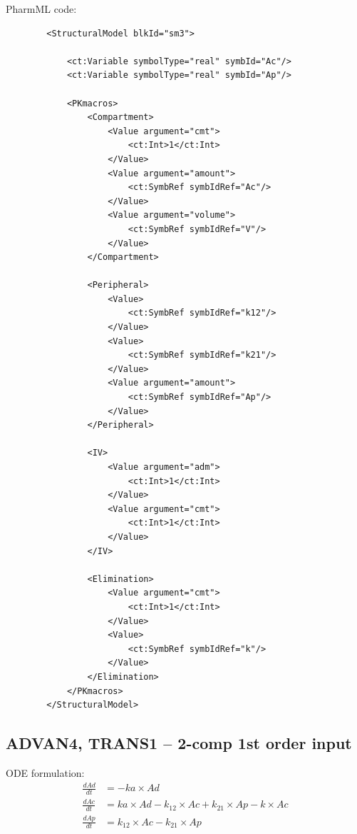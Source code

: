 PharmML code:
\lstset{language=XML}
\begin{lstlisting}
        <StructuralModel blkId="sm3">
            
            <ct:Variable symbolType="real" symbId="Ac"/>
            <ct:Variable symbolType="real" symbId="Ap"/>
            
            <PKmacros>
                <Compartment>
                    <Value argument="cmt">
                        <ct:Int>1</ct:Int>
                    </Value>
                    <Value argument="amount">
                        <ct:SymbRef symbIdRef="Ac"/>
                    </Value>
                    <Value argument="volume">
                        <ct:SymbRef symbIdRef="V"/>
                    </Value>
                </Compartment>
                
                <Peripheral>
                    <Value>
                        <ct:SymbRef symbIdRef="k12"/>
                    </Value>
                    <Value>
                        <ct:SymbRef symbIdRef="k21"/>
                    </Value>
                    <Value argument="amount">
                        <ct:SymbRef symbIdRef="Ap"/>
                    </Value>
                </Peripheral>
                
                <IV>
                    <Value argument="adm">
                        <ct:Int>1</ct:Int>
                    </Value>
                    <Value argument="cmt">
                        <ct:Int>1</ct:Int>
                    </Value>
                </IV>
                
                <Elimination>
                    <Value argument="cmt">
                        <ct:Int>1</ct:Int>
                    </Value>
                    <Value>
                        <ct:SymbRef symbIdRef="k"/>
                    </Value>
                </Elimination>
            </PKmacros>
        </StructuralModel>
\end{lstlisting}


\subsection{ADVAN4, TRANS1 -- 2-comp 1st order input}
ODE formulation:
\begin{align}
\frac{dAd}{dt} &= -ka \times Ad \nonumber \\
\frac{dAc}{dt} &= ka \times Ad - k_{12} \times Ac + k_{21} \times Ap - k \times Ac  \nonumber \\
\frac{dAp}{dt} &= k_{12} \times Ac - k_{21} \times Ap  \nonumber
\end{align}


